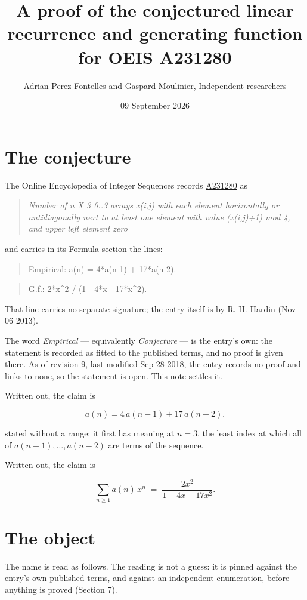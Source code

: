 \documentclass[11pt]{article}
\title{A proof of the conjectured linear recurrence and generating function for OEIS A231280}
\author{Adrian Perez Fontelles and Gaspard Moulinier, Independent researchers}
\date{09 September 2026}
\theoremstyle{definition}
\begin{document}
\maketitle
\section{The conjecture}

The Online Encyclopedia of Integer Sequences records \href{https://oeis.org/A231280}{A231280} as

\begin{quote}\itshape Number of n X 3 0..3 arrays x(i,j) with each element horizontally or antidiagonally next to at least one element with value (x(i,j)+1) mod 4, and upper left element zero\end{quote}

and carries in its Formula section the lines:

\begin{quote}\ttfamily Empirical: a(n) = 4*a(n-1) + 17*a(n-2).\end{quote}

\begin{quote}\ttfamily G.f.: 2*x\textasciicircum{}2 / (1 - 4*x - 17*x\textasciicircum{}2).\end{quote}

That line carries no separate signature; the entry itself is by R. H. Hardin (Nov 06 2013).

The word {\itshape Empirical} --- equivalently {\itshape Conjecture} --- is the entry's own: the statement is recorded as fitted to the published terms, and no proof is given there. As of revision 9, last modified Sep 28 2018, the entry records no proof and links to none, so the statement is open. This note settles it.

Written out, the claim is

\[a(n) = 4\,a(n-1) + 17\,a(n-2).\]

stated without a range; it first has meaning at $n = 3$, the least index at which all of $a(n-1),\dots,a(n-2)$ are terms of the sequence.

Written out, the claim is

\[\sum_{n \ge 1} a(n)\,x^n \;=\; \frac{2x^{2}}{1 - 4x - 17x^{2}}.\]

\section{The object}

The name is read as follows. The reading is not a guess: it is pinned against the entry's own published terms, and against an independent enumeration, before anything is proved (Section 7).
\end{document}
